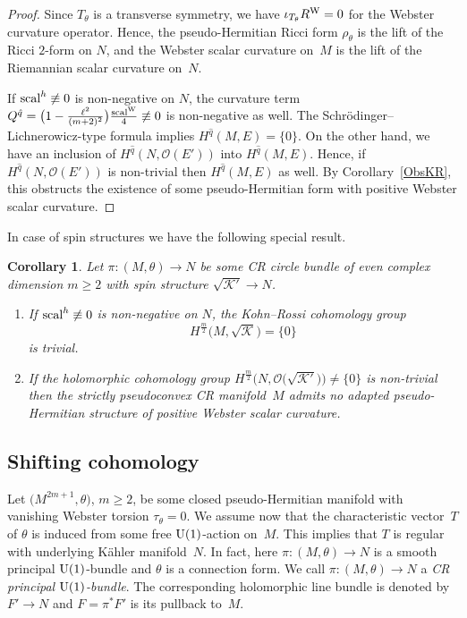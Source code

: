 \documentclass[pdftex]{sigma}
\numberwithin{equation}{section}
\newtheorem{Corollary}[Theorem]{Corollary}
\begin{document}
\begin{proof} Since $T_\theta$ is a transverse symmetry, we have $\iota_{T_\theta}R^{\rm W}=0$
for the Webster curvature operator. Hence, the pseudo-Hermitian Ricci form $\rho_\theta$ is the lift of the
Ricci $2$-form on $N$, and the Webster scalar curvature on~$M$ is the lift of the Riemannian scalar curvature on~$N$.

If ${\rm scal}^h\not\equiv0$ is non-negative on $N$, the curvature term $Q^{\hat{q}}=\big(1-\frac{\ell^2}{(m+2)^2}\big)\frac{{\rm scal}^{\rm W}}{4}\not\equiv 0$
is non-negative as well. The Schr\"odinger--Lichnerowicz-type formula implies $H^{\hat{q}}(M,E)=\{0\}$.
On the other hand, we have an inclusion of $H^{\hat{q}}(N,\mathcal{O}(E'))$ into $H^{\hat{q}}(M,E)$. Hence, if
$H^{\hat{q}}(N,\mathcal{O}(E'))$ is non-trivial then $H^{\hat{q}}(M,E)$ as well. By Corollary~\ref{ObsKR},
this obstructs the existence of some pseudo-Hermitian form with positive Webster scalar curvature.
\end{proof}

In case of spin structures we have the following special result.

\begin{Corollary} \label{cordem} Let $\pi\colon (M,\theta)\to N$ be some CR circle bundle of even complex dimension $m\geq 2$ with spin structure $\sqrt{\mathcal{K}'}\to N$.
\begin{enumerate}\itemsep=0pt
\item[$(a)$] If ${\rm scal}^h\not\equiv 0$ is non-negative on $N$, the Kohn--Rossi cohomology group
\[
H^{\frac{m}{2}}\big(M,\sqrt{\mathcal{K}}\big) = \{0\}
\]
is trivial.
\item[$(b)$]
If the holomorphic cohomology group $H^{\frac{m}{2}}\big(N,\mathcal{O}\big(\sqrt{\mathcal{K}'}\big)\big)\neq\{0\}$ is non-trivial then the strictly pseudoconvex CR manifold~$M$ admits no adapted pseudo-Hermitian structure of positive Webster scalar curvature.
\end{enumerate}
\end{Corollary}

\subsection{Shifting cohomology}

Let $\big(M^{2m+1},\theta\big)$, $m\geq 2$, be some closed pseudo-Hermitian manifold with vanishing Webster torsion $\tau_\theta=0$.
We assume now that the characteristic vector~$T$ of $\theta$
is induced from some free ${\rm U}(1)$-action on~$M$. This implies that $T$ is regular with underlying K\"ahler manifold~$N$.
In fact, here $\pi\colon (M,\theta)\to N$ is a smooth principal ${\rm U}(1)$-bundle and $\theta$ is a connection form.
We call $\pi\colon (M,\theta)\to N$ a {\em CR principal ${\rm U}(1)$-bundle}.
The corresponding holomorphic line bundle is denoted by $F'\to N$ and $F=\pi^*F'$ is its pullback to~$M$.
\end{document}
